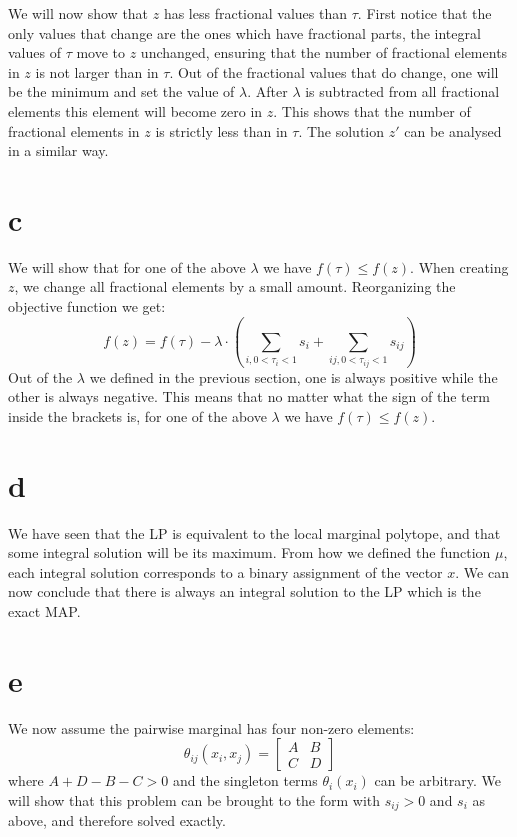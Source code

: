 \documentclass[11pt]{article}
\begin{document}
We will now show that $z$ has less fractional values than $\tau$.
First notice that the only values that change are the ones which have fractional parts,
the integral values of $\tau$ move to $z$ unchanged,
ensuring that the number of fractional elements in $z$ is not larger than in $\tau$.
Out of the fractional values that do change, one will be the minimum and set the value of $\lambda$.
After $\lambda$ is subtracted from all fractional elements this element will become zero in $z$.
This shows that the number of fractional elements in $z$ is strictly less than in $\tau$.
The solution $z'$ can be analysed in a similar way.

\section*{c}

We will show that for one of the above $\lambda$ we have $f(\tau) \leq f(z)$.
When creating $z$, we change all fractional elements by a small amount. Reorganizing the objective function we get:
\begin{equation*}
f(z) = f(\tau) - \lambda \cdot \left(
	\sum_{i, 0<\tau_{i}<1} s_i + \sum_{ij, 0<\tau_{ij}<1} s_{ij}
\right)
\end{equation*}
Out of the $\lambda$ we defined in the previous section,
one is always positive while the other is always negative.
This means that no matter what the sign of the term inside the brackets is, for one of the above $\lambda$ we have $f(\tau) \leq f(z)$.

\section*{d}

We have seen that the LP is equivalent to the local marginal polytope,
and that some integral solution will be its maximum.
From how we defined the function $\mu$, each integral solution corresponds to a binary assignment
of the vector $x$.
We can now conclude that there is always an integral solution to the LP which is the exact MAP.

\section*{e}

We now assume the pairwise marginal has four non-zero elements:
\begin{equation}
\theta_{ij}(x_i,x_j) =
\begin{bmatrix}
A & B \\
C & D
\end{bmatrix}
\end{equation}
where $A + D - B - C > 0$ and the singleton terms $\theta_i(x_i)$ can be arbitrary.
We will show that this problem can be brought to the form with $s_{ij} > 0$ and $s_i$ as above, and therefore solved exactly.
\end{document}
